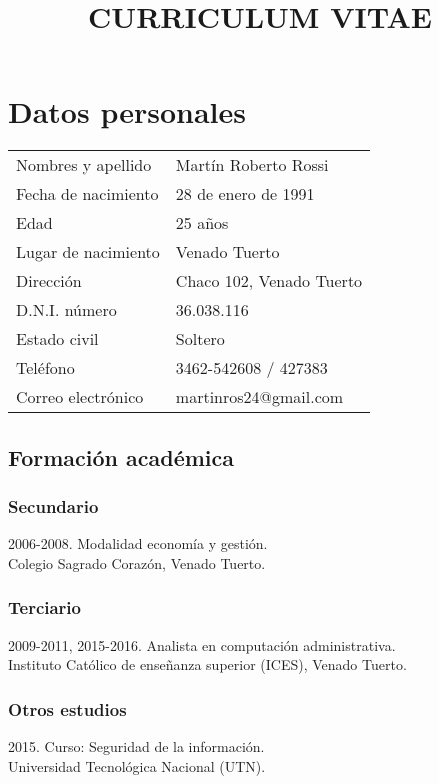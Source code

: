\documentclass[10pt]{article}
\title{\huge{\textbf{CURRICULUM VITAE}}\vspace{-2.5ex}}
\date{}
\begin{document}
\maketitle
\section*{Datos personales}
\bgroup
\def\arraystretch{1.25}
\begin{tabular}{p{5cm} l}
  Nombres y apellido&Martín Roberto Rossi\\
  Fecha de nacimiento&28 de enero de 1991\\
  Edad&25 años\\
  Lugar de nacimiento&Venado Tuerto\\
  Dirección&Chaco 102, Venado Tuerto\\
  D.N.I. número&36.038.116\\
  Estado civil&Soltero\\
  Teléfono&3462-542608 / 427383\\
  Correo electrónico&martinros24@gmail.com\\
\end{tabular}
\setlength{\unitlength}{0.5cm}
\subsection*{Formación académica}
\subsubsection*{Secundario}
\normalsize{2006-2008. Modalidad economía y gestión.}\\\small{Colegio Sagrado Corazón, Venado Tuerto.}
\subsubsection*{Terciario}
\normalsize{2009-2011, 2015-2016. Analista en computación administrativa.}\\\small{Instituto Católico de enseñanza superior (ICES), Venado Tuerto.}
\subsubsection*{Otros estudios}
\normalsize{2015. Curso: Seguridad de la información.}\\\small{Universidad Tecnológica Nacional (UTN).}
\end{document}
